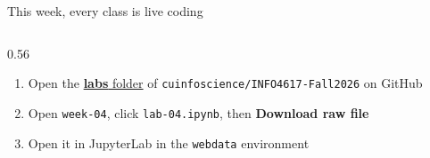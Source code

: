 \documentclass[9pt,aspectratio=169]{beamer}
\begin{document}
\begin{frame}{This week, every class is live coding}
    \begin{columns}[T]
        \begin{column}{0.56\textwidth}
            \begin{enumerate}\small
                \item Open the \href{https://github.com/cuinfoscience/INFO4617-Fall2026/tree/main/labs}{\textbf{labs} folder} of \texttt{cuinfoscience/INFO4617-Fall2026} on GitHub
                \item Open \texttt{week-04}, click \texttt{lab-04.ipynb}, then \textbf{Download raw file}
                \item Open it in JupyterLab in the \texttt{webdata} environment
            \end{enumerate}


\end{column}
\end{columns}
\end{frame}
\end{document}
